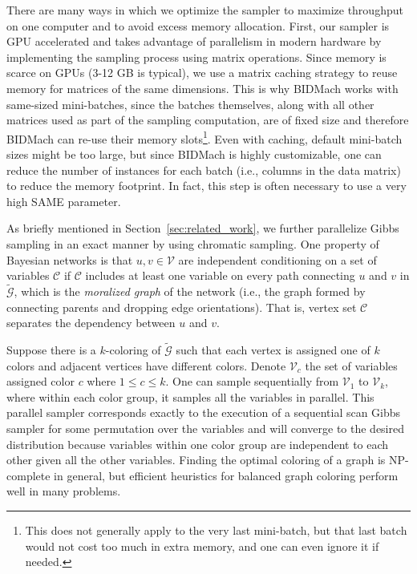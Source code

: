 \documentclass{article} %
\begin{document}
There are many ways in which we optimize the sampler to maximize throughput on one computer and to
avoid excess memory allocation. First, our sampler is GPU accelerated and takes advantage of
parallelism in modern hardware by implementing the sampling process using matrix operations. Since
memory is scarce on GPUs (3-12 GB is typical), we use a matrix caching strategy to reuse memory for
matrices of the same dimensions. This is why BIDMach works with same-sized mini-batches, since the
batches themselves, along with all other matrices used as part of the sampling computation, are of
fixed size and therefore BIDMach can re-use their memory slots\footnote{This does not generally
apply to the very last mini-batch, but that last batch would not cost too much in extra memory, and
one can even ignore it if needed.}. Even with caching, default mini-batch sizes might be too large,
but since BIDMach is highly customizable, one can reduce the number of instances for each batch
(i.e., columns in the data matrix) to reduce the memory footprint. In fact, this step is often
necessary to use a very high SAME parameter.

As briefly mentioned in Section~\ref{sec:related_work}, we further parallelize Gibbs sampling in an
exact manner by using chromatic sampling. One property of Bayesian networks is that $u, v \in
\mathcal{V}$ are independent conditioning on a set of variables $\mathcal{C}$ if $\mathcal{C}$
includes at least one variable on every path connecting $u$ and $v$ in $\tilde{\mathcal{G}}$, which
is the \emph{moralized graph} of the network (i.e., the graph formed by connecting parents and
dropping edge orientations). That is, vertex set $\mathcal{C}$ separates the dependency between $u$
and $v$.

Suppose there is a $k$-coloring of $\tilde{\mathcal{G}}$ such that each vertex is assigned one of $k$
colors and adjacent vertices have different colors. Denote $\mathcal{V}_c$ the set of variables
assigned color $c$ where $1 \leq c \leq k$. One can sample sequentially from $\mathcal{V}_1$ to
$\mathcal{V}_k$, where within each color group, it samples all the variables in parallel. This
parallel sampler corresponds exactly to the execution of a sequential scan Gibbs sampler for some
permutation over the variables and will converge to the desired distribution because variables
within one color group are independent to each other given all the other variables. Finding the
optimal coloring of a graph is NP-complete in general, but efficient heuristics for balanced graph
coloring perform well in many problems.
\end{document}
